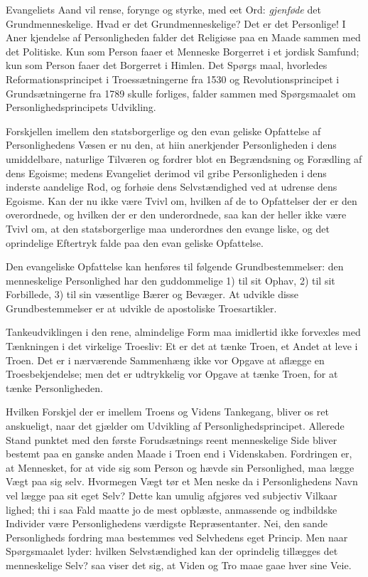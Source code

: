 \documentclass[12pt]{book}
\newcommand{\opage}[1]{\marginnote{\footnotesize\textit{[#1]}}}
\begin{document}
Evangeliets Aand vil rense, forynge og styrke, med
eet Ord: \textit{gjenføde} det Grundmenneskelige. Hvad er det
Grundmenneskelige? Det er det Personlige! I Aner\-%
kjendelse af Personligheden falder det Religiøse paa en
Maade sammen med det Politiske. Kun som Person
faaer et Menneske Borgerret i et jordisk Samfund; kun
som Person faaer det Borgerret i Himlen. Det Spørgs\-%
maal, hvorledes Reformationsprincipet i Troessætningerne
fra 1530 og Revolutionsprincipet i Grundsætningerne fra
\opage{138}\setcounter{footnote}{0}%
1789 skulle forliges, falder sammen med Spørgsmaalet
om Personlighedsprincipets Udvikling.

Forskjellen imellem den statsborgerlige og den evan\-%
geliske Opfattelse af Personlighedens Væsen er nu den,
at hiin anerkjender Personligheden i dens umiddelbare,
naturlige Tilværen og fordrer blot en Begrændsning og
Forædling af dens Egoisme; medens Evangeliet derimod
vil gribe Personligheden i dens inderste aandelige Rod,
og forhøie dens Selvstændighed ved at udrense dens
Egoisme. Kan der nu ikke være Tvivl om, hvilken af
de to Opfattelser der er den overordnede, og hvilken der
er den underordnede, saa kan der heller ikke være Tvivl
om, at den statsborgerlige maa underordnes den evange\-%
liske, og det oprindelige Eftertryk falde paa den evan\-%
geliske Opfattelse.

Den evangeliske Opfattelse kan henføres til følgende
Grundbestemmelser: den menneskelige Personlighed har
den guddommelige 1) til sit Ophav, 2) til sit Forbillede,
3) til sin væsentlige Bærer og Bevæger. At udvikle
disse Grundbestemmelser er at udvikle de apostoliske
Troesartikler.

Tankeudviklingen i den rene, almindelige Form maa
imidlertid ikke forvexles med Tænkningen i det virkelige
Troesliv: Et er det at tænke Troen, et Andet at leve i
Troen. Det er i nærværende Sammenhæng ikke vor Opgave
at aflægge en Troesbekjendelse; men det er udtrykkelig vor
Opgave at tænke Troen, for at tænke Personligheden.

Hvilken Forskjel der er imellem Troens og Videns
Tankegang, bliver os ret anskueligt, naar det gjælder om
Udvikling af Personlighedsprincipet. Allerede Stand\-%
punktet med den første Forudsætnings reent menneskelige
Side bliver bestemt paa en ganske anden Maade i Troen
end i Videnskaben. Fordringen er, at Mennesket, for at
vide sig som Person og hævde sin Personlighed, maa
\opage{139}\setcounter{footnote}{0}%
lægge Vægt paa sig selv. Hvormegen Vægt tør et Men\-%
neske da i Personlighedens Navn vel lægge paa sit eget
Selv? Dette kan umulig afgjøres ved subjectiv Vilkaar\-%
lighed; thi i saa Fald maatte jo de mest opblæste,
anmassende og indbildske Individer være Personlighedens
værdigste Repræsentanter. Nei, den sande Personligheds\-%
fordring maa bestemmes ved Selvhedens eget Princip.
Men naar Spørgsmaalet lyder: hvilken Selvstændighed
kan der oprindelig tillægges det menneskelige Selv? saa
viser det sig, at Viden og Tro maae gaae hver sine
Veie.
\end{document}
